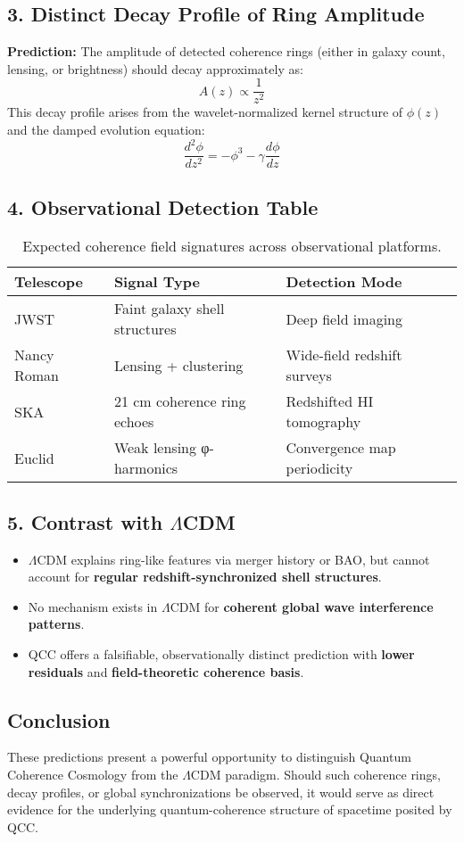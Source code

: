 \subsection*{3. Distinct Decay Profile of Ring Amplitude}

\textbf{Prediction:} The amplitude of detected coherence rings (either in galaxy count, lensing, or brightness) should decay approximately as:
\[
A(z) \propto \frac{1}{z^2}
\]
This decay profile arises from the wavelet-normalized kernel structure of \( \phi(z) \) and the damped evolution equation:
\[
\frac{d^2\phi}{dz^2} = -\phi^3 - \gamma \frac{d\phi}{dz}
\]

\subsection*{4. Observational Detection Table}

\begin{table}[h!]
\centering
\begin{tabular}{|l|l|l|}
\hline
\textbf{Telescope} & \textbf{Signal Type} & \textbf{Detection Mode} \\
\hline
JWST & Faint galaxy shell structures & Deep field imaging \\
Nancy Roman & Lensing + clustering & Wide-field redshift surveys \\
SKA & 21 cm coherence ring echoes & Redshifted HI tomography \\
Euclid & Weak lensing φ-harmonics & Convergence map periodicity \\
\hline
\end{tabular}
\caption{Expected coherence field signatures across observational platforms.}
\end{table}

\subsection*{5. Contrast with \(\Lambda\)CDM}

\begin{itemize}
    \item \(\Lambda\)CDM explains ring-like features via merger history or BAO, but cannot account for \textbf{regular redshift-synchronized shell structures}.
    \item No mechanism exists in \(\Lambda\)CDM for \textbf{coherent global wave interference patterns}.
    \item QCC offers a falsifiable, observationally distinct prediction with \textbf{lower residuals} and \textbf{field-theoretic coherence basis}.
\end{itemize}

\subsection*{Conclusion}

These predictions present a powerful opportunity to distinguish Quantum Coherence Cosmology from the \(\Lambda\)CDM paradigm. Should such coherence rings, decay profiles, or global synchronizations be observed, it would serve as direct evidence for the underlying quantum-coherence structure of spacetime posited by QCC.
